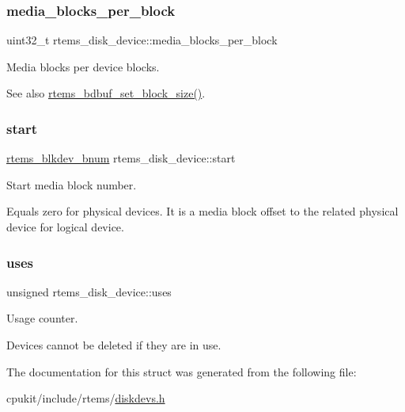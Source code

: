 \subsubsection{\texorpdfstring{media\_blocks\_per\_block}{media\_blocks\_per\_block}}
{\footnotesize\ttfamily uint32\+\_\+t rtems\+\_\+disk\+\_\+device\+::media\+\_\+blocks\+\_\+per\+\_\+block}



Media blocks per device blocks. 

\begin{DoxySeeAlso}{See also}
\mbox{\hyperlink{group__rtems__bdbuf_ga649b3b4fb368921f579a0204552a7a60}{rtems\+\_\+bdbuf\+\_\+set\+\_\+block\+\_\+size()}}. 
\end{DoxySeeAlso}
\mbox{\label{structrtems__disk__device_a6fc636a2742b7d9407e559cdd3899e6e}} 
\subsubsection{\texorpdfstring{start}{start}}
{\footnotesize\ttfamily \mbox{\hyperlink{group__rtems__disk_ga5fbcfd40b657bff6c54d9e393fab3274}{rtems\+\_\+blkdev\+\_\+bnum}} rtems\+\_\+disk\+\_\+device\+::start}



Start media block number. 

Equals zero for physical devices. It is a media block offset to the related physical device for logical device. \mbox{\label{structrtems__disk__device_a5a8a2b41e014367de746f134f2c9ade5}} 
\subsubsection{\texorpdfstring{uses}{uses}}
{\footnotesize\ttfamily unsigned rtems\+\_\+disk\+\_\+device\+::uses}



Usage counter. 

Devices cannot be deleted if they are in use. 

The documentation for this struct was generated from the following file\+:\begin{DoxyCompactItemize}
\item 
cpukit/include/rtems/\mbox{\hyperlink{diskdevs_8h}{diskdevs.\+h}}\end{DoxyCompactItemize}
